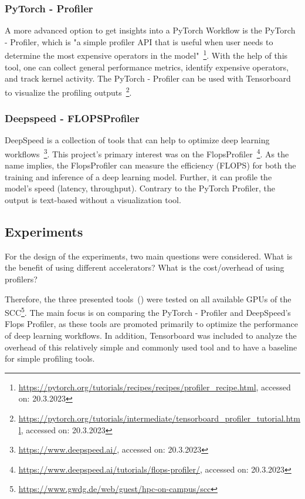 \documentclass[12pt, a4paper, hidelinks]{article}
\begin{document}
\subsubsection{PyTorch - Profiler}
\label{sec:m-pytorch-profiler}

A more advanced option to get insights into a PyTorch Workflow is the PyTorch - Profiler, which is "a simple profiler API that is useful when user needs to determine the most expensive operators in the model"~\footnote{\url{https://pytorch.org/tutorials/recipes/recipes/profiler_recipe.html}, accessed on: 20.3.2023}.
With the help of this tool, one can collect general performance metrics, identify expensive operators, and track kernel activity.
The PyTorch - Profiler can be used with Tensorboard to visualize the profiling outputs~\footnote{\url{https://pytorch.org/tutorials/intermediate/tensorboard_profiler_tutorial.html}, accessed on: 20.3.2023}.


\subsubsection{Deepspeed - FLOPSProfiler}
\label{sec:m-FLOPSprofiler}

DeepSpeed is a collection of tools that can help to optimize deep learning workflows~\footnote{\url{https://www.deepspeed.ai/}, accessed on: 20.3.2023}.
This project's primary interest was on the FlopsProfiler~\footnote{\url{https://www.deepspeed.ai/tutorials/flops-profiler/}, accessed on: 20.3.2023}. 
As the name implies, the FlopsProfiler can measure the efficiency (\ac{FLOPS}) for both the training and inference of a deep learning model. Further, it can profile the model's speed (latency, throughput).
Contrary to the PyTorch Profiler, the output is text-based without a visualization tool.


\subsection{Experiments}
\label{sec:m-experiments}

For the design of the experiments, two main questions were considered.
What is the benefit of using different accelerators? What is the cost/overhead of using profilers?

Therefore, the three presented tools~() were tested on all available \ac{GPU}s of the \ac{SCC}\footnote{\url{https://www.gwdg.de/web/guest/hpc-on-campus/scc}}.
The main focus is on comparing the PyTorch - Profiler and DeepSpeed's Flops Profiler, as these tools are promoted primarily to optimize the performance of deep learning workflows. In addition, Tensorboard was included to analyze the overhead of this relatively simple and commonly used tool and to have a baseline for simple profiling tools.
\end{document}
